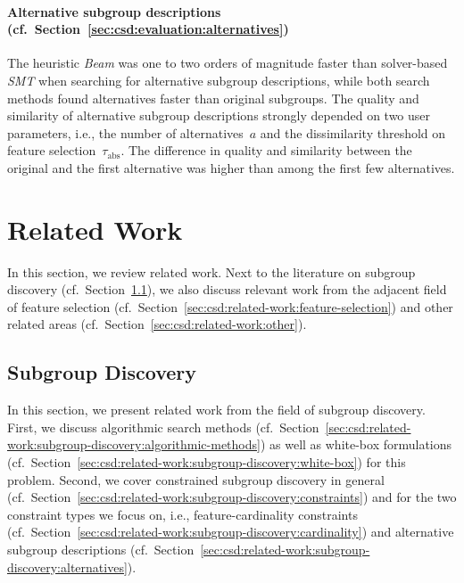 \documentclass{article}
\theoremstyle{definition}
\begin{document}
\paragraph{Alternative subgroup descriptions (cf.~Section~\ref{sec:csd:evaluation:alternatives})}

The heuristic \emph{Beam} was one to two orders of magnitude faster than solver-based \emph{SMT} when searching for alternative subgroup descriptions, while both search methods found alternatives faster than original subgroups.
The quality and similarity of alternative subgroup descriptions strongly depended on two user parameters, i.e., the number of alternatives~$a$ and the dissimilarity threshold on feature selection~$\tau_{\text{abs}}$.
The difference in quality and similarity between the original and the first alternative was higher than among the first few alternatives.

\section{Related Work}
\label{sec:csd:related-work}

In this section, we review related work.
Next to the literature on subgroup discovery (cf.~Section~\ref{sec:csd:related-work:subgroup-discovery}), we also discuss relevant work from the adjacent field of feature selection (cf.~Section~\ref{sec:csd:related-work:feature-selection}) and other related areas (cf.~Section~\ref{sec:csd:related-work:other}).

\subsection{Subgroup Discovery}
\label{sec:csd:related-work:subgroup-discovery}

In this section, we present related work from the field of subgroup discovery.
First, we discuss algorithmic search methods (cf.~Section~\ref{sec:csd:related-work:subgroup-discovery:algorithmic-methods}) as well as white-box formulations (cf.~Section~\ref{sec:csd:related-work:subgroup-discovery:white-box}) for this problem.
Second, we cover constrained subgroup discovery in general (cf.~Section~\ref{sec:csd:related-work:subgroup-discovery:constraints}) and for the two constraint types we focus on, i.e., feature-cardinality constraints (cf.~Section~\ref{sec:csd:related-work:subgroup-discovery:cardinality}) and alternative subgroup descriptions (cf.~Section~\ref{sec:csd:related-work:subgroup-discovery:alternatives}).
\end{document}
